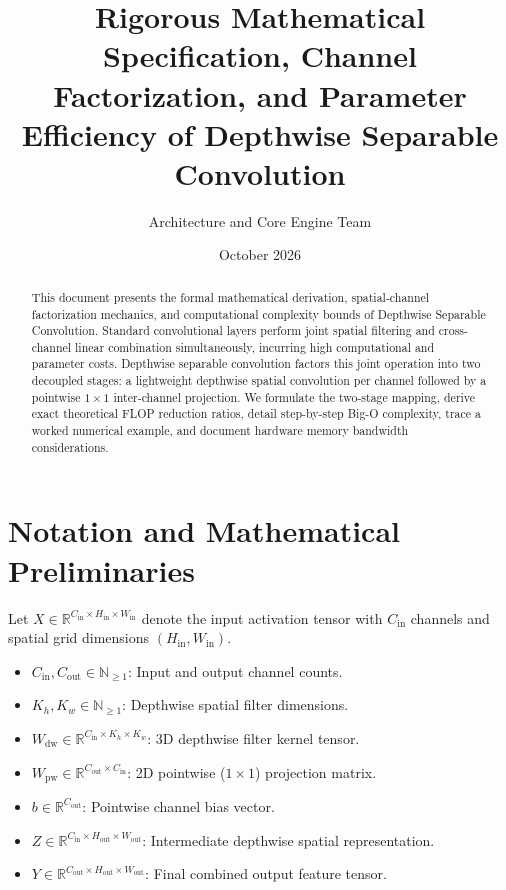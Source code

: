 \documentclass[11pt,a4paper]{article}
\title{\textbf{Rigorous Mathematical Specification, Channel Factorization, and Parameter Efficiency of Depthwise Separable Convolution}}
\author{Architecture and Core Engine Team}
\date{October 2026}
\theoremstyle{definition}
\begin{document}
\maketitle

\begin{abstract}
This document presents the formal mathematical derivation, spatial-channel factorization mechanics, and computational complexity bounds of Depthwise Separable Convolution. Standard convolutional layers perform joint spatial filtering and cross-channel linear combination simultaneously, incurring high computational and parameter costs. Depthwise separable convolution factors this joint operation into two decoupled stages: a lightweight depthwise spatial convolution per channel followed by a pointwise $1 \times 1$ inter-channel projection. We formulate the two-stage mapping, derive exact theoretical FLOP reduction ratios, detail step-by-step Big-O complexity, trace a worked numerical example, and document hardware memory bandwidth considerations.
\end{abstract}

\section{Notation and Mathematical Preliminaries}

Let $X \in \mathbb{R}^{C_{\text{in}} \times H_{\text{in}} \times W_{\text{in}}}$ denote the input activation tensor with $C_{\text{in}}$ channels and spatial grid dimensions $(H_{\text{in}}, W_{\text{in}})$.

\begin{itemize}
    \item $C_{\text{in}}, C_{\text{out}} \in \mathbb{N}_{\ge 1}$: Input and output channel counts.
    \item $K_h, K_w \in \mathbb{N}_{\ge 1}$: Depthwise spatial filter dimensions.
    \item $W_{\text{dw}} \in \mathbb{R}^{C_{\text{in}} \times K_h \times K_w}$: 3D depthwise filter kernel tensor.
    \item $W_{\text{pw}} \in \mathbb{R}^{C_{\text{out}} \times C_{\text{in}}}$: 2D pointwise ($1 \times 1$) projection matrix.
    \item $b \in \mathbb{R}^{C_{\text{out}}}$: Pointwise channel bias vector.
    \item $Z \in \mathbb{R}^{C_{\text{in}} \times H_{\text{out}} \times W_{\text{out}}}$: Intermediate depthwise spatial representation.
    \item $Y \in \mathbb{R}^{C_{\text{out}} \times H_{\text{out}} \times W_{\text{out}}}$: Final combined output feature tensor.
\end{itemize}
\end{document}
